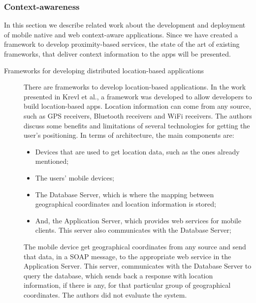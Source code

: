 \subsubsection{Context-awareness}
\label{sub:frameworks_context_aware}
In this section we describe related work about the
development and deployment of mobile native and web
context-aware applications.
Since we have created a framework to develop
proximity-based services, the state
of the art of existing frameworks, that deliver
context information to the apps will be presented.
\begin{description}
  \item[Frameworks for developing distributed
  location-based applications]
  There are frameworks to develop location-based
  applications.
  In the work presented in Krevl et al.\cite{Krevl2006},
  a framework
  was developed to allow developers to build
  location-based apps. Location information can come
  from any source, such as \gls{GPS} receivers, Bluetooth
  receivers and \gls{WiFi} receivers.
  The authors discuss some benefits and limitations
  of several technologies for getting the
  user's positioning.
  In terms of architecture, the main components
  are:
  \begin{itemize}
  \item
  Devices that are used to get location data, such as
  the ones already mentioned;
  \item The users' mobile devices;
  \item The Database Server, which is where the mapping
  between geographical coordinates and location
  information is stored;
  \item And, the Application Server, which provides web services for
  mobile clients. This server also communicates
  with the Database Server;
  \end{itemize}
  The mobile device get geographical coordinates
  from any source and send that data, in a
  \gls{SOAP}\cite{Seely:2001:SCP:560836} message,
  to the appropriate web service in the Application
  Server. This server, communicates with the Database Server
  to query the database, which sends back a response with
  location information, if there is any, for that
  particular group of geographical coordinates.
  The authors did not evaluate the system.


\end{description}
